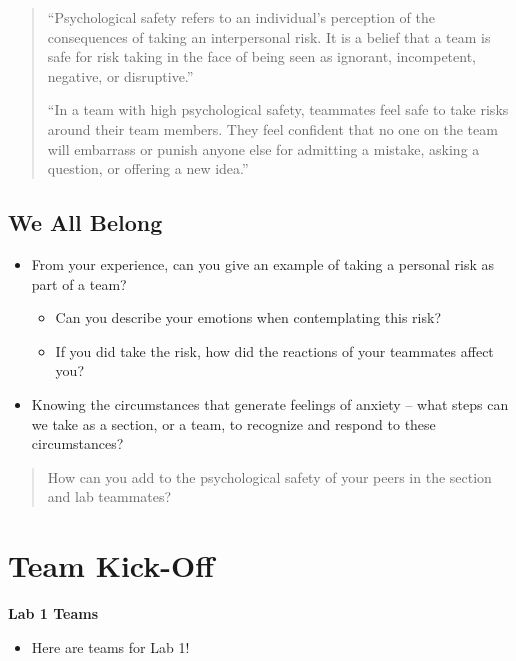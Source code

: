 \documentclass[
  letterpaper,
  DIV=11,
  numbers=noendperiod]{scrreprt}
\providecommand{\tightlist}{%
  \setlength{\itemsep}{0pt}\setlength{\parskip}{0pt}}\usepackage{longtable,booktabs,array}
\begin{document}
\begin{quote}
``Psychological safety refers to an individual's perception of the
consequences of taking an interpersonal risk. It is a belief that a team
is safe for risk taking in the face of being seen as ignorant,
incompetent, negative, or disruptive.''

``In a team with high psychological safety, teammates feel safe to take
risks around their team members. They feel confident that no one on the
team will embarrass or punish anyone else for admitting a mistake,
asking a question, or offering a new idea.''
\end{quote}

\subsection{We All Belong}\label{we-all-belong}

\begin{itemize}
\tightlist
\item
  From your experience, can you give an example of taking a personal
  risk as part of a team?

  \begin{itemize}
  \tightlist
  \item
    Can you describe your emotions when contemplating this risk?
  \item
    If you did take the risk, how did the reactions of your teammates
    affect you?
  \end{itemize}
\item
  Knowing the circumstances that generate feelings of anxiety -- what
  steps can we take as a section, or a team, to recognize and respond to
  these circumstances?
\end{itemize}

\begin{quote}
How can you add to the psychological safety of your peers in the section
and lab teammates?
\end{quote}

\section{Team Kick-Off}\label{team-kick-off}

\textbf{Lab 1 Teams}

\begin{itemize}
\tightlist
\item
  Here are teams for Lab 1!
\end{itemize}
\end{document}
